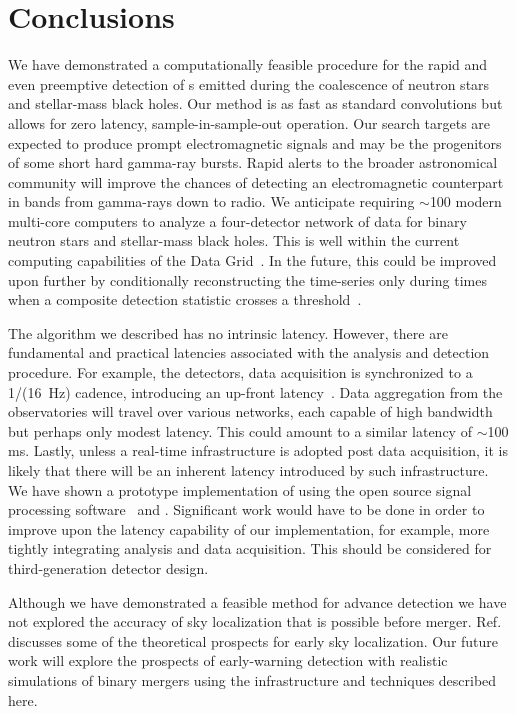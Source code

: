 \section{Conclusions}
\label{sec:conclusions}

We have demonstrated a computationally feasible procedure for the rapid and
even preemptive detection of \GW{}s emitted during the coalescence
of neutron stars and stellar-mass black holes. Our method is as fast as
standard \fft{} convolutions but allows for zero latency, sample-in-sample-out
operation.  Our search targets are expected to produce prompt electromagnetic
signals and may be the progenitors of some short hard gamma-ray bursts.  Rapid
alerts to the broader astronomical community will improve the chances of
detecting an electromagnetic counterpart in bands from gamma-rays down to
radio.  We anticipate requiring $\sim$100 modern multi-core computers to
analyze a four-detector network of \GW{} data for binary neutron
stars and stellar-mass black holes.  This is well within the current computing
capabilities of the \LIGO{} Data Grid~\citep{LDG}. In the future, this could be
improved upon further by conditionally reconstructing the \SNR{} time-series
only during times when a composite detection statistic crosses a
threshold~\citep{svd-compdetstat}.

The algorithm we described has no intrinsic latency.  However, there are
fundamental and practical latencies associated with the analysis and detection
procedure. For example, the \LIGO{} detectors, data acquisition is synchronized
to a 1/(16~Hz) cadence, introducing an up-front latency~\citep{Bork2001}. Data
aggregation from the observatories will travel over various networks, each
capable of high bandwidth but perhaps only modest latency.  This could amount to
a similar latency of $\sim$100 ms.  Lastly, unless a real-time infrastructure
is adopted post data acquisition, it is likely that there will be an inherent
latency introduced by such infrastructure.  We have shown a prototype
implementation of \lloid{} using the open source signal processing software
\gstreamer\ and \gstlal. Significant work would have to be done in order to
improve upon the latency capability of our implementation, for example, more
tightly integrating analysis and data acquisition. This should be considered
for third-generation detector design.

Although we have demonstrated a feasible method for advance detection we have
not explored the accuracy of sky localization that is possible before merger.
Ref.~\citep{Fairhurst2009} discusses some of the theoretical prospects for early
sky localization.  Our future work will explore the prospects of early-warning
detection with realistic simulations of binary mergers using the infrastructure
and techniques described here. 

